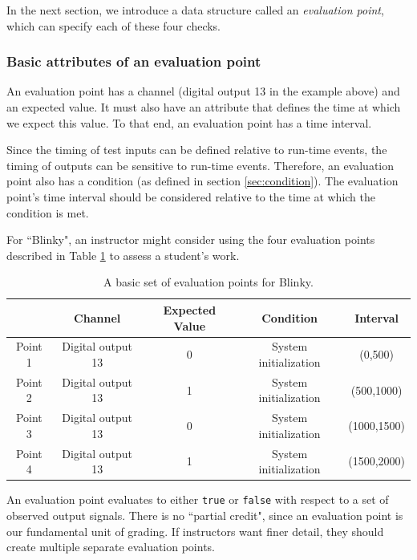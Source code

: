 \documentclass[12pt]{article}
\begin{document}
In the next section, we introduce a data structure called an \textit{evaluation point}, which can specify each of these four checks.

\subsubsection{Basic attributes of an evaluation point}
An evaluation point has a channel (digital output 13 in the example above) and an expected value.  It must also have an attribute that defines the time at which we expect this value.  To that end, an evaluation point has a time interval.

Since the timing of test inputs can be defined relative to run-time events, the timing of outputs can be sensitive to run-time events.  Therefore, an evaluation point also has a condition (as defined in section \ref{sec:condition}).  The evaluation point's time interval should be considered relative to the time at which the condition is met.

For ``Blinky", an instructor might consider using the four evaluation points described in Table \ref{table:blinky-basic-points} to assess a student's work.

\begin{table}[ht]
\begin{center}
\caption{A basic set of evaluation points for Blinky.}
\label{table:blinky-basic-points}
\begin{tabular}{c|cccc}
& Channel & Expected Value & Condition & Interval \\ \hline
Point 1 & Digital output 13 & 0 & System initialization & (0,500) \\
Point 2 & Digital output 13 & 1 & System initialization & (500,1000) \\
Point 3 & Digital output 13 & 0 & System initialization & (1000,1500) \\
Point 4 & Digital output 13 & 1 & System initialization & (1500,2000) \\ \hline
\end{tabular}
\end{center}
\end{table}

An evaluation point evaluates to either \texttt{true} or \texttt{false} with respect to a set of observed output signals.  There is no ``partial credit", since an evaluation point is our fundamental unit of grading.  If instructors want finer detail, they should create multiple separate evaluation points. 
\end{document}
